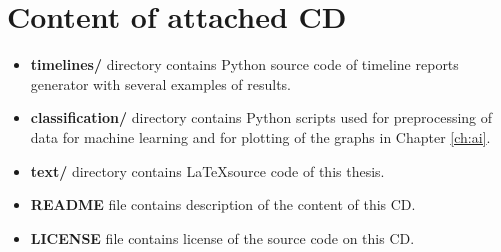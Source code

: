 \chapter{Content of attached CD}
\begin{itemize}
\item \textbf{timelines/} directory contains Python source code of timeline reports generator
  with several examples of results.
\item \textbf{classification/} directory contains Python scripts used for preprocessing of data
  for machine learning and for plotting of the graphs in Chapter \ref{ch:ai}.
\item \textbf{text/} directory contains \LaTeX source code of this thesis.
\item \textbf{README} file contains description of the content of this CD.
\item \textbf{LICENSE} file contains license of the source code on this CD.
\end{itemize}